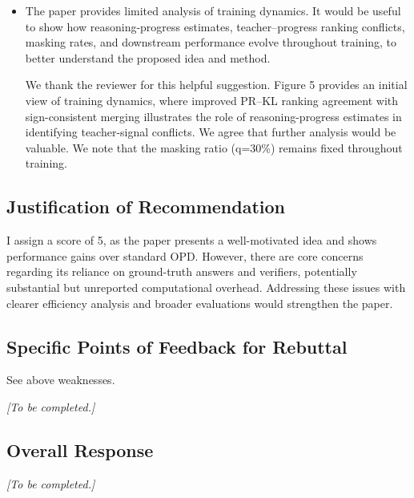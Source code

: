 \documentclass[11pt,a4paper]{article}
\begin{document}
\begin{itemize}
\item The paper provides limited analysis of training dynamics. It would be useful to show how reasoning-progress estimates, teacher--progress ranking conflicts, masking rates, and downstream performance evolve throughout training, to better understand the proposed idea and method.
\par{}
\begin{responsebox}[frametitle={Response to W3}]
We thank the reviewer for this helpful suggestion. Figure 5 provides an initial view of training dynamics, where improved PR--KL ranking agreement with sign-consistent merging illustrates the role of reasoning-progress estimates in identifying teacher-signal conflicts. We agree that further analysis would be valuable. We note that the masking ratio (q=30\%) remains fixed throughout training.
\end{responsebox}

\end{itemize}

\subsection*{Justification of Recommendation}
I assign a score of 5, as the paper presents a well-motivated idea and shows performance gains over standard OPD. However, there are core concerns regarding its reliance on ground-truth answers and verifiers, potentially substantial but unreported computational overhead. Addressing these issues with clearer efficiency analysis and broader evaluations would strengthen the paper.

\subsection*{Specific Points of Feedback for Rebuttal}
See above weaknesses.

\par{}
\begin{responsebox}[frametitle={Response to Q1},nobreak=true]
\textit{[To be completed.]}\par\vspace{1em}
\end{responsebox}

\subsection*{Overall Response}
\par{}
\begin{responsebox}[frametitle={Overall Response to Reviewer 3 (XU6y)},nobreak=true]
\textit{[To be completed.]}\par\vspace{1em}
\end{responsebox}
\end{document}
